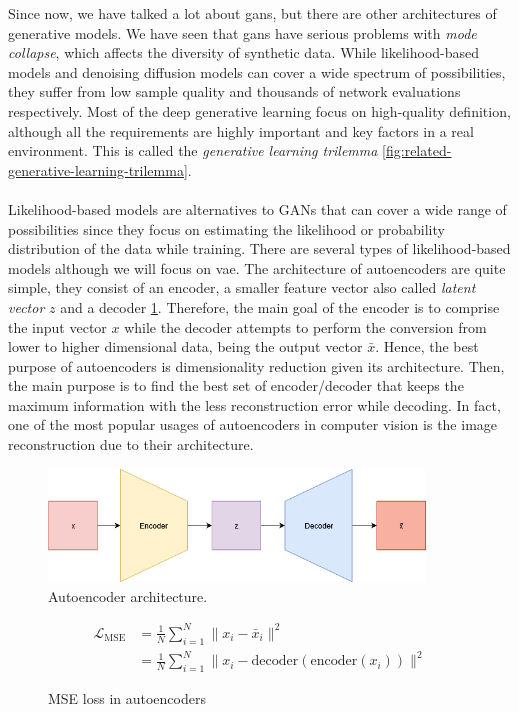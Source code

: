 \documentclass[11pt, a4paper]{article}
\begin{document}
	Since now, we have talked a lot about \gls{gan}s, but there are other architectures of generative models. We have seen that \gls{gan}s have serious problems with \textit{mode collapse}, which affects the diversity of synthetic data. While likelihood-based models and denoising diffusion models can cover a wide spectrum of possibilities, they suffer from low sample quality and thousands of network evaluations respectively. Most of the deep generative learning focus on high-quality definition, although all the requirements are highly important and key factors in a real environment. This is called the \textit{generative learning trilemma} \ref{fig:related-generative-learning-trilemma}.
	\\\\
	Likelihood-based models are alternatives to GANs that can cover a wide range of possibilities since they focus on estimating the likelihood or probability distribution of the data while training. There are several types of likelihood-based models although we will focus on \gls{vae}. The architecture of autoencoders are quite simple, they consist of an encoder, a smaller feature vector also called \textit{latent vector} $z$ and a decoder \ref{fig:related-autoencoder}. Therefore, the main goal of the encoder is to comprise the input vector $x$ while the decoder attempts to perform the conversion from lower to higher dimensional data, being the output vector $\bar{x}$. Hence, the best purpose of autoencoders is dimensionality reduction given its architecture. Then, the main purpose is to find the best set of encoder/decoder that keeps the maximum information with the less reconstruction error while decoding. In fact, one of the most popular usages of autoencoders in computer vision is the image reconstruction due to their architecture.
	\begin{figure}[H]
		\centering
		\includegraphics[width=10cm]{imgs/relatedwork/autoencoder}
		\caption{Autoencoder architecture.}
		\label{fig:related-autoencoder}
	\end{figure}
	\begin{figure}[H]
		\begin{align*}
			\mathcal{L}_{\text{MSE}} &= \frac{1}{N} \sum_{i=1}^{N} \| x_i - \bar{x}_i \|^2\\
				&= \frac{1}{N} \sum_{i=1}^{N} \| x_i - \text{decoder}(\text{encoder}(x_i)) \|^2
		\end{align*}
		\caption{MSE loss in autoencoders}
	\end{figure}
\end{document}

